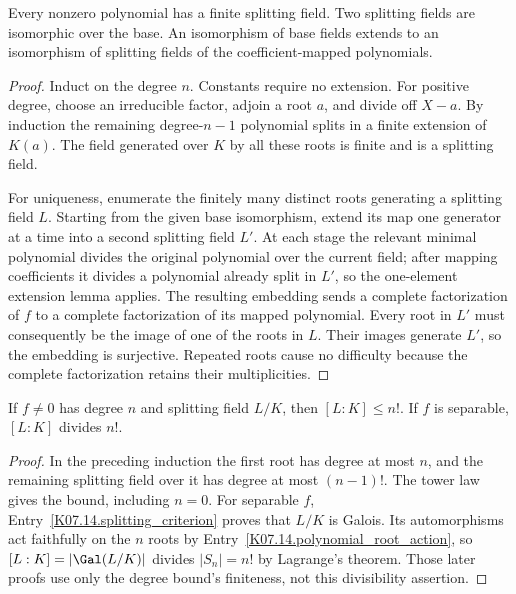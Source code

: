 \begin{theorem}
Every nonzero polynomial has a finite splitting field. Two splitting fields are isomorphic over the base. An isomorphism of base fields extends to an isomorphism of splitting fields of the coefficient-mapped polynomials.
\end{theorem}
\begin{proof}
Induct on the degree $n$. Constants require no extension. For positive degree, choose an irreducible factor, adjoin a root $a$, and divide off $X-a$. By induction the remaining degree-$n-1$ polynomial splits in a finite extension of $K(a)$. The field generated over $K$ by all these roots is finite and is a splitting field.

For uniqueness, enumerate the finitely many distinct roots generating a splitting field $L$. Starting from the given base isomorphism, extend its map one generator at a time into a second splitting field $L'$. At each stage the relevant minimal polynomial divides the original polynomial over the current field; after mapping coefficients it divides a polynomial already split in $L'$, so the one-element extension lemma applies. The resulting embedding sends a complete factorization of $f$ to a complete factorization of its mapped polynomial. Every root in $L'$ must consequently be the image of one of the roots in $L$. Their images generate $L'$, so the embedding is surjective. Repeated roots cause no difficulty because the complete factorization retains their multiplicities.
\end{proof}

\begin{theorem}
If $f\ne0$ has degree $n$ and splitting field $L/K$, then $[L:K]\leq n!$. If $f$ is separable, $[L:K]$ divides $n!$.
\end{theorem}
\begin{proof}
In the preceding induction the first root has degree at most $n$, and the remaining splitting field over it has degree at most $(n-1)!$. The tower law gives the bound, including $n=0$. For separable $f$, Entry~\ref{K07.14.splitting_criterion} proves that $L/K$ is Galois. Its automorphisms act faithfully on the $n$ roots by Entry~\ref{K07.14.polynomial_root_action}, so $[L:K]=|\Gal(L/K)|$ divides $|S_n|=n!$ by Lagrange's theorem. Those later proofs use only the degree bound's finiteness, not this divisibility assertion.
\end{proof}

